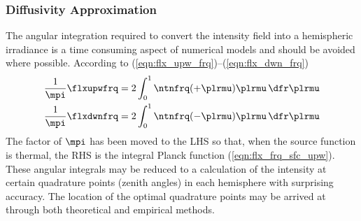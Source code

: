 \documentclass[12pt]{article}
\begin{document}
\subsubsection[Diffusivity Approximation]{Diffusivity Approximation}\label{sxn:dff_prx} 
The angular integration required to convert the intensity field into a
hemispheric irradiance is a time consuming aspect of numerical models  
and should be avoided where possible.
According to (\ref{eqn:flx_upw_frq})--(\ref{eqn:flx_dwn_frq})
\begin{subequations}
\label{eqn:flx_hms_4}
\begin{align}
\label{eqn:flx_hms_4_a}
\frac{1}{\mpi} \flxupwfrq & = 2 \int_{0}^{1} \ntnfrq (+\plrmu) \plrmu \,
\dfr\plrmu \\
\label{eqn:flx_hms_4_b}
\frac{1}{\mpi} \flxdwnfrq & = 2 \int_{0}^{1} \ntnfrq (-\plrmu) \plrmu \,
\dfr\plrmu 
\end{align}
\end{subequations} 
The factor of $\mpi$ has been moved to the LHS so that, when the source
function is thermal, the RHS is the integral Planck function
(\ref{eqn:flx_frq_sfc_upw}). 
These angular integrals may be reduced to a calculation of the
intensity at certain quadrature points (zenith angles) in each
hemisphere with surprising accuracy.
The location of the optimal quadrature points may be arrived at
through both theoretical and empirical methods.
\end{document}

